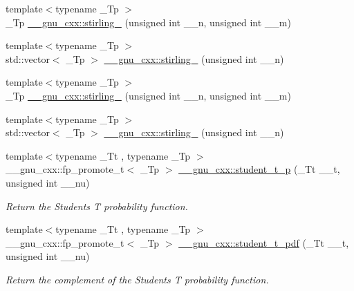 \begin{DoxyCompactItemize}
\item 
{\footnotesize template$<$typename \+\_\+\+Tp $>$ }\\\+\_\+\+Tp \hyperlink{group__gnu__math__spec__func_ga2b955dac7d2c5125f2091eaeb25c8ad2}{\+\_\+\+\_\+gnu\+\_\+cxx\+::stirling\+\_} (unsigned int \+\_\+\+\_\+n, unsigned int \+\_\+\+\_\+m)
\item 
{\footnotesize template$<$typename \+\_\+\+Tp $>$ }\\std\+::vector$<$ \+\_\+\+Tp $>$ \hyperlink{group__gnu__math__spec__func_gaff3d42b2ec5364d24c1ad0ef4b374a8d}{\+\_\+\+\_\+gnu\+\_\+cxx\+::stirling\+\_} (unsigned int \+\_\+\+\_\+n)
\item 
{\footnotesize template$<$typename \+\_\+\+Tp $>$ }\\\+\_\+\+Tp \hyperlink{group__gnu__math__spec__func_ga3761c0e467cbe45cbda66a4e796adcd3}{\+\_\+\+\_\+gnu\+\_\+cxx\+::stirling\+\_} (unsigned int \+\_\+\+\_\+n, unsigned int \+\_\+\+\_\+m)
\item 
{\footnotesize template$<$typename \+\_\+\+Tp $>$ }\\std\+::vector$<$ \+\_\+\+Tp $>$ \hyperlink{group__gnu__math__spec__func_ga6a2386b3e0940935f10a163baa925656}{\+\_\+\+\_\+gnu\+\_\+cxx\+::stirling\+\_} (unsigned int \+\_\+\+\_\+n)
\item 
{\footnotesize template$<$typename \+\_\+\+Tt , typename \+\_\+\+Tp $>$ }\\\+\_\+\+\_\+gnu\+\_\+cxx\+::fp\+\_\+promote\+\_\+t$<$ \+\_\+\+Tp $>$ \hyperlink{group__gnu__math__spec__func_ga5a84386b009ac57a726d5d0314fdf7ce}{\+\_\+\+\_\+gnu\+\_\+cxx\+::student\+\_\+t\+\_\+p} (\+\_\+\+Tt \+\_\+\+\_\+t, unsigned int \+\_\+\+\_\+nu)
\begin{DoxyCompactList}\small\item\em Return the Students T probability function. \end{DoxyCompactList}\item 
{\footnotesize template$<$typename \+\_\+\+Tt , typename \+\_\+\+Tp $>$ }\\\+\_\+\+\_\+gnu\+\_\+cxx\+::fp\+\_\+promote\+\_\+t$<$ \+\_\+\+Tp $>$ \hyperlink{group__gnu__math__spec__func_ga95a4c03cf0a8104e9a15a35acfe5fb3a}{\+\_\+\+\_\+gnu\+\_\+cxx\+::student\+\_\+t\+\_\+pdf} (\+\_\+\+Tt \+\_\+\+\_\+t, unsigned int \+\_\+\+\_\+nu)
\begin{DoxyCompactList}\small\item\em Return the complement of the Students T probability function. \end{DoxyCompactList}\item 

\end{DoxyCompactItemize}
